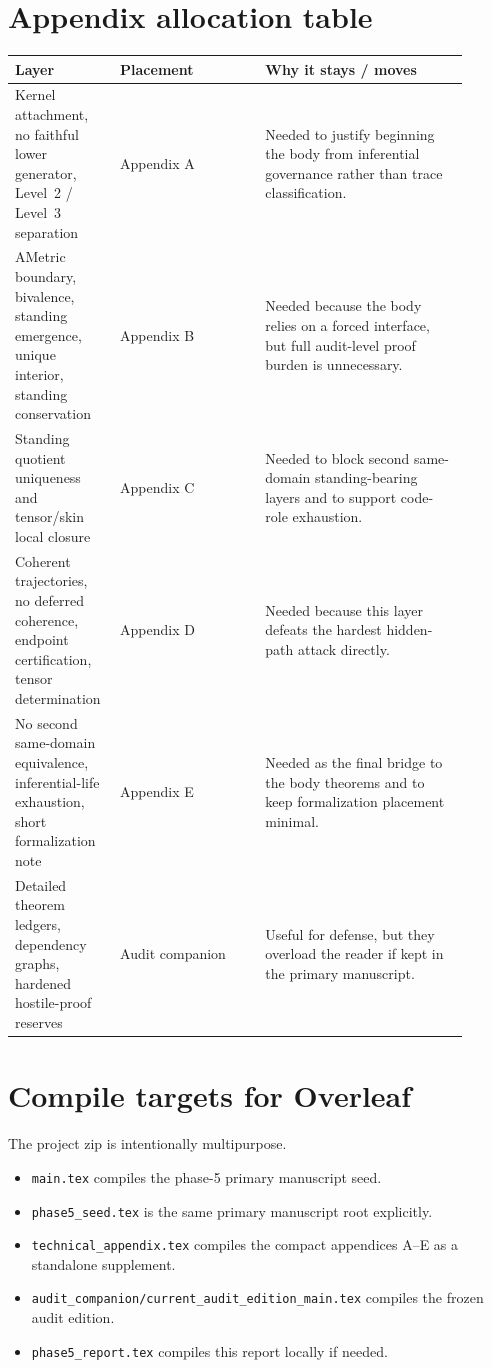 \documentclass[11pt]{article}
\begin{document}
\section{Appendix allocation table}
\begin{center}
\begin{tabular}{p{0.18\linewidth}p{0.30\linewidth}p{0.42\linewidth}}
\toprule
Layer & Placement & Why it stays / moves \\
\midrule
Kernel attachment, no faithful lower generator, Level~2 / Level~3 separation & Appendix A & Needed to justify beginning the body from inferential governance rather than trace classification. \\
AMetric boundary, bivalence, standing emergence, unique interior, standing conservation & Appendix B & Needed because the body relies on a forced interface, but full audit-level proof burden is unnecessary. \\
Standing quotient uniqueness and tensor/skin local closure & Appendix C & Needed to block second same-domain standing-bearing layers and to support code-role exhaustion. \\
Coherent trajectories, no deferred coherence, endpoint certification, tensor determination & Appendix D & Needed because this layer defeats the hardest hidden-path attack directly. \\
No second same-domain equivalence, inferential-life exhaustion, short formalization note & Appendix E & Needed as the final bridge to the body theorems and to keep formalization placement minimal. \\
Detailed theorem ledgers, dependency graphs, hardened hostile-proof reserves & Audit companion & Useful for defense, but they overload the reader if kept in the primary manuscript. \\
\bottomrule
\end{tabular}
\end{center}

\section{Compile targets for Overleaf}
The project zip is intentionally multipurpose.
\begin{itemize}
  \item \texttt{main.tex} compiles the phase-5 primary manuscript seed.
  \item \texttt{phase5\_seed.tex} is the same primary manuscript root explicitly.
  \item \texttt{technical\_appendix.tex} compiles the compact appendices A--E as a standalone supplement.
  \item \texttt{audit\_companion/current\_audit\_edition\_main.tex} compiles the frozen audit edition.
  \item \texttt{phase5\_report.tex} compiles this report locally if needed.
\end{itemize}
\end{document}
